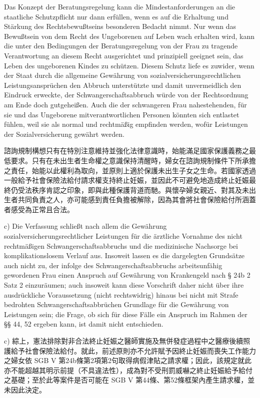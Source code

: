 \documentclass[12pt]{article}
\begin{document}
\begin{sourcepara}[title={原文E.216}]
Das Konzept der Beratungsregelung kann die Mindestanforderungen an die staatliche Schutzpflicht nur dann erfüllen, wenn es auf die Erhaltung und Stärkung des Rechtsbewußtseins besonderen Bedacht nimmt. Nur wenn das Bewußtsein von dem Recht des Ungeborenen auf Leben wach erhalten wird, kann die unter den Bedingungen der Beratungsregelung von der Frau zu tragende Verantwortung an diesem Recht ausgerichtet und prinzipiell geeignet sein, das Leben des ungeborenen Kindes zu schützen. Diesem Schutz liefe es zuwider, wenn der Staat durch die allgemeine Gewährung von sozialversicherungsrechtlichen Leistungsansprüchen den Abbruch unterstützte und damit unvermeidlich den Eindruck erweckte, der Schwangerschaftsabbruch würde von der Rechtsordnung am Ende doch gutgeheißen. Auch die der schwangeren Frau nahestehenden, für sie und das Ungeborene mitverantwortlichen Personen könnten sich entlastet fühlen, weil sie als normal und rechtmäßig empfinden werden, wofür Leistungen der Sozialversicherung gewährt werden.
\end{sourcepara}
\begin{transpara}
諮詢規制構想只有在特別注意維持並強化法律意識時，始能滿足國家保護義務之最低要求。只有在未出生者生命權之意識保持清醒時，婦女在諮詢規制條件下所承擔之責任，始能以此權利為取向，並原則上適於保護未出生子女之生命。若國家透過一般給予社會保險法給付請求權支持終止妊娠，並因此不可避免地造成終止妊娠最終仍受法秩序肯認之印象，即與此種保護背道而馳。與懷孕婦女親近、對其及未出生者共同負責之人，亦可能感到責任負擔被解除，因為其會將社會保險給付所涵蓋者感受為正常且合法。
\end{transpara}

\begin{sourcepara}[title={原文E.217}]
c) Die Verfassung schließt nach allem die Gewährung sozialversicherungsrechtlicher Leistungen für die ärztliche Vornahme des nicht rechtmäßigen Schwangerschaftsabbruchs und die medizinische Nachsorge bei komplikationslosem Verlauf aus. Insoweit lassen es die dargelegten Grundsätze auch nicht zu, der infolge des Schwangerschaftsabbruchs arbeitsunfähig gewordenen Frau einen Anspruch auf Gewährung von Krankengeld nach § 24b \abbrAbs{} 2 Satz 2 \abbrSGBV{} einzuräumen; auch insoweit kann diese Vorschrift daher nicht über ihre ausdrückliche Voraussetzung (nicht rechtswidrig) hinaus bei nicht mit Strafe bedrohten Schwangerschaftsabbrüchen Grundlage für die Gewährung von Leistungen sein; die Frage, ob sich für diese Fälle ein Anspruch im Rahmen der §§ 44, 52 \abbrSGBV{} ergeben kann, ist damit nicht entschieden.
\end{sourcepara}
\begin{transpara}
c) 綜上，憲法排除對非合法終止妊娠之醫師實施及無併發症過程中之醫療後續照護給予社會保險法給付。就此，前述原則亦不允許賦予因終止妊娠而喪失工作能力之婦女依 SGB V 第24b條第2項第2句取得病假津貼之請求權；因此，該規定就此亦不能超越其明示前提（不具違法性），成為對不受刑罰威嚇之終止妊娠給予給付之基礎；至於此等案件是否可能在 SGB V 第44條、第52條框架內產生請求權，並未因此決定。
\end{transpara}
\end{document}
